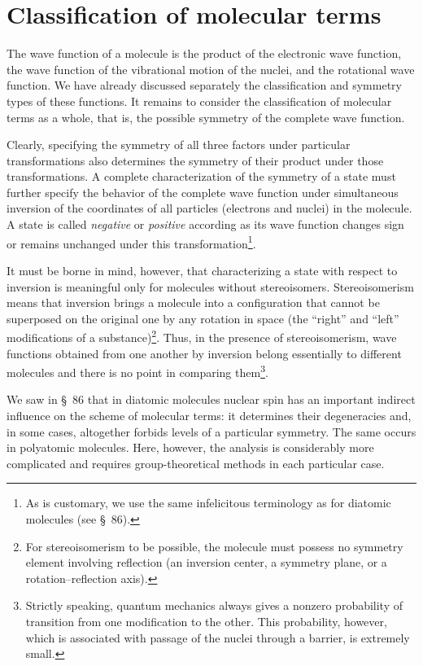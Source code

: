 \section{Classification of molecular terms}

The wave function of a molecule is the product of the electronic wave function, the wave function of the vibrational motion of the nuclei, and the rotational wave function. We have already discussed separately the classification and symmetry types of these functions. It remains to consider the classification of molecular terms as a whole, that is, the possible symmetry of the complete wave function.

Clearly, specifying the symmetry of all three factors under particular transformations also determines the symmetry of their product under those transformations. A complete characterization of the symmetry of a state must further specify the behavior of the complete wave function under simultaneous inversion of the coordinates of all particles (electrons and nuclei) in the molecule. A state is called \emph{negative} or \emph{positive} according as its wave function changes sign or remains unchanged under this transformation\footnote{As is customary, we use the same infelicitous terminology as for diatomic molecules (see \S~86).}.

It must be borne in mind, however, that characterizing a state with respect to inversion is meaningful only for molecules without stereoisomers. Stereoisomerism means that inversion brings a molecule into a configuration that cannot be superposed on the original one by any rotation in space (the ``right'' and ``left'' modifications of a substance)\footnote{For stereoisomerism to be possible, the molecule must possess no symmetry element involving reflection (an inversion center, a symmetry plane, or a rotation--reflection axis).}. Thus, in the presence of stereoisomerism, wave functions obtained from one another by inversion belong essentially to different molecules and there is no point in comparing them\footnote{Strictly speaking, quantum mechanics always gives a nonzero probability of transition from one modification to the other. This probability, however, which is associated with passage of the nuclei through a barrier, is extremely small.}.

We saw in \S~86 that in diatomic molecules nuclear spin has an important indirect influence on the scheme of molecular terms: it determines their degeneracies and, in some cases, altogether forbids levels of a particular symmetry. The same occurs in polyatomic molecules. Here, however, the analysis is considerably more complicated and requires group-theoretical methods in each particular case.

